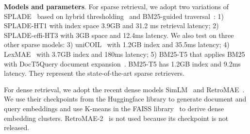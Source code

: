 {\bf Models and parameters}.
For sparse retrieval, we adopt two variations of 
SPLADE~\cite{Formal2021SPLADE, Formal_etal_SIGIR2022_splade++,Lassance2022SPLADE-efficient} 
based on hybrid thresholding~\cite{2023SIGIR-Qiao} and  BM25-guided traversal~\cite{mallia2022faster,qiao2023optimizing}:
1) SPLADE-HT1 with index space 3.9GB and 31.2 ms retrieval latency; 
2) SPLADE-effi-HT3 with  3GB space and  12.4ms latency. 
We also test on three other sparse models:
3) uniCOIL~\cite{ Lin2021unicoil,2021NAACL-Gao-COIL} with 1.2GB index and 35.5ms latency;
4) LexMAE~\cite{shen2023lexmae} with 3.7GB index and 180ms latency;
5) BM25-T5 that applies  BM25 with  DocT5Query document expansion~\cite{Cheriton2019doct5query}.  
BM25-T5 has 1.2GB index and  9.2ms latency. 
They represent the state-of-the-art sparse retrievers.

For dense retrieval, we adopt the recent dense models
SimLM~\cite{Wang2022SimLM} and RetroMAE~\cite{Liu2022RetroMAE}. 
We use their checkpoints from the Huggingface library to generate document and query embeddings 
and  use  K-means in the FAISS library~\cite{johnson2019billion} to derive dense embedding clusters.
RetroMAE-2~\cite{liu-etal-2023-retromae} is not used because its checkpoint is not released.


